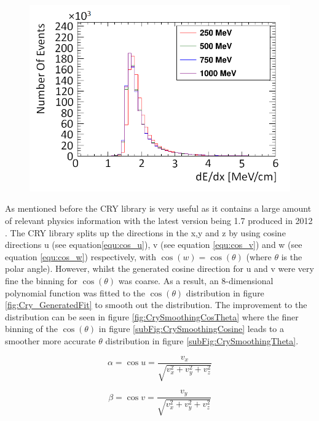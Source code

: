 \begin{figure}[!h]
 \centering
 \includegraphics[width=0.5\linewidth]{Chapter4/Figs/Raster/year1Plots/muons_per_mev_cmMedText.png}
 \label{fig:mev_per_cm_muons}
\end{figure}

As mentioned before the CRY library is very useful as it contains a large amount of relevant physics information with the latest version being 1.7 produced in 2012 \cite{hagmann2012cosmicCry}. The CRY library splits up the directions in the x,y and z by using cosine directions u (see equation\ref{equ:cos_u}), v (see equation \ref{equ:cos_v}) and w (see equation \ref{equ:cos_w}) respectively, with $\cos(w) = \cos(\theta)$ (where $\theta$ is the polar angle). However, whilst the generated cosine direction for u and v were very fine the binning for $\cos(\theta)$ was coarse. As a result, an 8-dimensional polynomial function was fitted to the $\cos(\theta)$ distribution in figure \ref{fig:Cry_GeneratedFit} to smooth out the distribution. The improvement to the distribution can be seen in figure \ref{fig:CrySmoothingCosTheta} where the finer binning of the $\cos(\theta)$ in figure \ref{subFig:CrySmoothingCosine} leads to a smoother more accurate $\theta$ distribution in figure \ref{subFig:CrySmoothingTheta}. 

\begin{equation}
\alpha = \cos{u} = \frac{v_x}{\sqrt{v_x^2+v_y^2+v_z^2}}
\label{equ:cos_u}
\end{equation}

\begin{equation}
\beta = \cos{v} = \frac{v_y}{\sqrt{v_x^2+v_y^2+v_z^2}}
\label{equ:cos_v}
\end{equation}

